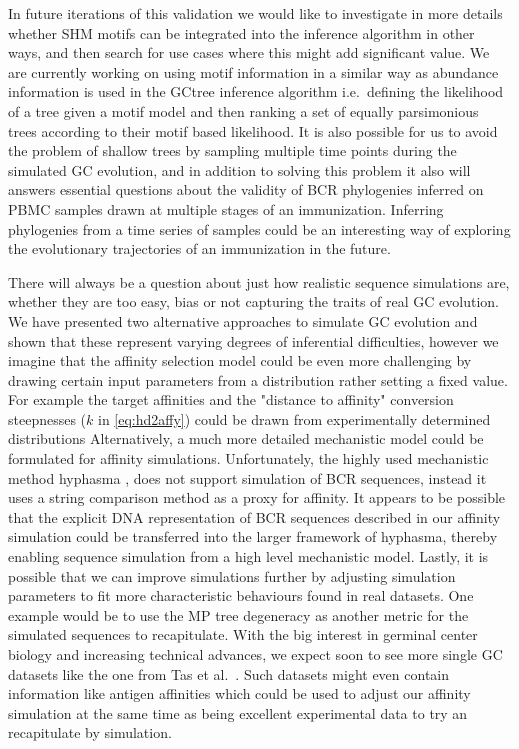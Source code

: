 In future iterations of this validation we would like to investigate in more details whether SHM motifs can be integrated into the inference algorithm in other ways, and then search for use cases where this might add significant value.
We are currently working on using motif information in a similar way as abundance information is used in the GCtree inference algorithm i.e.\ defining the likelihood of a tree given a motif model and then ranking a set of equally parsimonious trees according to their motif based likelihood.
It is also possible for us to avoid the problem of shallow trees by sampling multiple time points during the simulated GC evolution, and in addition to solving this problem it also will answers essential questions about the validity of BCR phylogenies inferred on PBMC samples drawn at multiple stages of an immunization.
Inferring phylogenies from a time series of samples could be an interesting way of exploring the evolutionary trajectories of an immunization in the future.

There will always be a question about just how realistic sequence simulations are, whether they are too easy, bias or not capturing the traits of real GC evolution.
We have presented two alternative approaches to simulate GC evolution and shown that these represent varying degrees of inferential difficulties, however we imagine that the affinity selection model could be even more challenging by drawing certain input parameters from a distribution rather setting a fixed value.
For example the target affinities and the "distance to affinity" conversion steepnesses ($k$ in \eqref{eq:hd2affy}) could be drawn from experimentally determined distributions 
Alternatively, a much more detailed mechanistic model could be formulated for affinity simulations.
Unfortunately, the highly used mechanistic method hyphasma \cite{robert2017simulate}, does not support simulation of BCR sequences, instead it uses a string comparison method as a proxy for affinity.
It appears to be possible that the explicit DNA representation of BCR sequences described in our affinity simulation could be transferred into the larger framework of hyphasma, thereby enabling sequence simulation from a high level mechanistic model.
Lastly, it is possible that we can improve simulations further by adjusting simulation parameters to fit more characteristic behaviours found in real datasets.
One example would be to use the MP tree degeneracy as another metric for the simulated sequences to recapitulate.
With the big interest in germinal center biology and increasing technical advances, we expect soon to see more single GC datasets like the one from Tas et al.\ \cite{tas2016visualizing}.
Such datasets might even contain information like antigen affinities which could be used to adjust our affinity simulation at the same time as being excellent experimental data to try an recapitulate by simulation.


